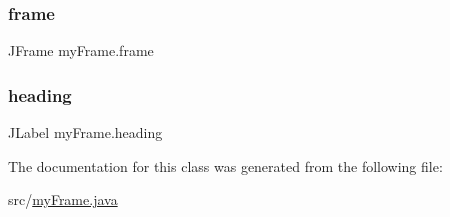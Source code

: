 \hypertarget{classmy_frame_a963c049a55022bde2ded62a4bd17c742}{}\label{classmy_frame_a963c049a55022bde2ded62a4bd17c742} 
\subsubsection{\texorpdfstring{frame}{frame}}
{\footnotesize\ttfamily J\+Frame my\+Frame.\+frame\hspace{0.3cm}{\ttfamily [private]}}

\hypertarget{classmy_frame_a06126b852f7b1fa4587cb244e3ec4d2b}{}\label{classmy_frame_a06126b852f7b1fa4587cb244e3ec4d2b} 
\subsubsection{\texorpdfstring{heading}{heading}}
{\footnotesize\ttfamily J\+Label my\+Frame.\+heading\hspace{0.3cm}{\ttfamily [private]}}



The documentation for this class was generated from the following file\+:\begin{DoxyCompactItemize}
\item 
src/\hyperlink{my_frame_8java}{my\+Frame.\+java}\end{DoxyCompactItemize}
